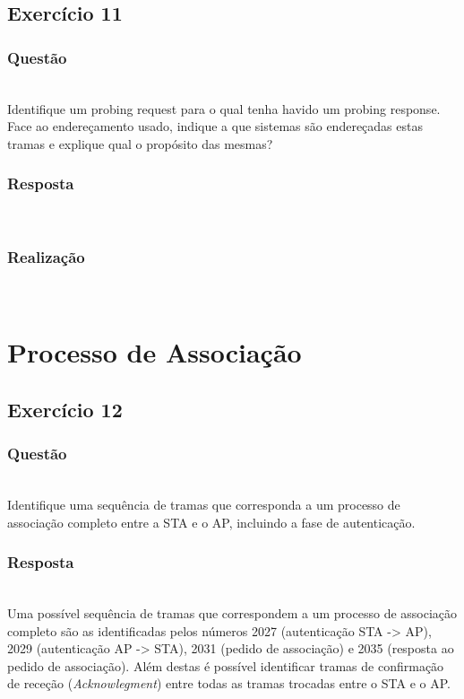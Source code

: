 \documentclass{llncs}
\begin{document}
\clearpage
\subsection{Exercício 11}
\subsubsection{Questão}\rule[-10pt]{0pt}{10pt}\\

Identifique um probing request para o qual tenha havido um probing response. Face ao endereçamento usado, indique a que sistemas são endereçadas estas tramas e explique qual o propósito das mesmas?

\subsubsection{Resposta}\rule[-10pt]{0pt}{10pt}\\



\subsubsection{Realização}\rule[-10pt]{0pt}{10pt}\\



\clearpage

\section{Processo de Associação}
\subsection{Exercício 12}
\subsubsection{Questão}\rule[-10pt]{0pt}{10pt}\\

Identifique uma sequência de tramas que corresponda a um processo de associação completo entre a STA e o AP, incluindo a fase de autenticação.

\subsubsection{Resposta}\rule[-10pt]{0pt}{10pt}\\

Uma possível sequência de tramas que correspondem a um processo de associação completo são as identificadas pelos números 2027 (autenticação STA -> AP), 2029 (autenticação AP -> STA), 2031 (pedido de associação) e 2035 (resposta ao pedido de associação). Além destas é possível identificar tramas de confirmação de receção (\textit{Acknowlegment}) entre todas as tramas trocadas entre o STA e o AP.
\end{document}
